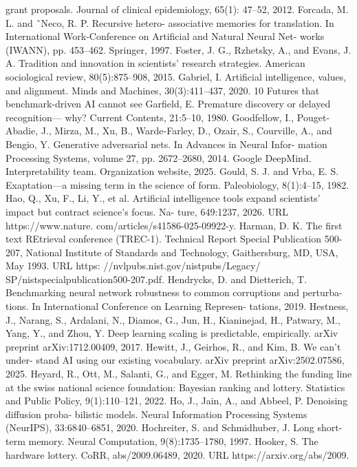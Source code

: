 grant proposals. Journal of clinical epidemiology, 65(1):
47–52, 2012.
Forcada, M. L. and ˜Neco, R. P.
Recursive hetero-
associative memories for translation. In International
Work-Conference on Artificial and Natural Neural Net-
works (IWANN), pp. 453–462. Springer, 1997.
Foster, J. G., Rzhetsky, A., and Evans, J. A. Tradition and
innovation in scientists’ research strategies. American
sociological review, 80(5):875–908, 2015.
Gabriel, I. Artificial intelligence, values, and alignment.
Minds and Machines, 30(3):411–437, 2020.
10
Futures that benchmark-driven AI cannot see
Garfield, E. Premature discovery or delayed recognition—
why? Current Contents, 21:5–10, 1980.
Goodfellow, I., Pouget-Abadie, J., Mirza, M., Xu, B.,
Warde-Farley, D., Ozair, S., Courville, A., and Bengio, Y.
Generative adversarial nets. In Advances in Neural Infor-
mation Processing Systems, volume 27, pp. 2672–2680,
2014.
Google DeepMind. Interpretability team. Organization
website, 2025.
Gould, S. J. and Vrba, E. S. Exaptation—a missing term in
the science of form. Paleobiology, 8(1):4–15, 1982.
Hao, Q., Xu, F., Li, Y., et al. Artificial intelligence tools
expand scientists’ impact but contract science’s focus. Na-
ture, 649:1237, 2026. URL https://www.nature.
com/articles/s41586-025-09922-y.
Harman, D. K.
The first text REtrieval conference
(TREC-1).
Technical Report Special Publication
500-207, National Institute of Standards and Technology,
Gaithersburg, MD, USA, May 1993.
URL https:
//nvlpubs.nist.gov/nistpubs/Legacy/
SP/nistspecialpublication500-207.pdf.
Hendrycks, D. and Dietterich, T. Benchmarking neural
network robustness to common corruptions and perturba-
tions. In International Conference on Learning Represen-
tations, 2019.
Hestness, J., Narang, S., Ardalani, N., Diamos, G., Jun,
H., Kianinejad, H., Patwary, M., Yang, Y., and Zhou, Y.
Deep learning scaling is predictable, empirically. arXiv
preprint arXiv:1712.00409, 2017.
Hewitt, J., Geirhos, R., and Kim, B.
We can’t under-
stand AI using our existing vocabulary. arXiv preprint
arXiv:2502.07586, 2025.
Heyard, R., Ott, M., Salanti, G., and Egger, M. Rethinking
the funding line at the swiss national science foundation:
Bayesian ranking and lottery. Statistics and Public Policy,
9(1):110–121, 2022.
Ho, J., Jain, A., and Abbeel, P. Denoising diffusion proba-
bilistic models. Neural Information Processing Systems
(NeurIPS), 33:6840–6851, 2020.
Hochreiter, S. and Schmidhuber, J. Long short-term memory.
Neural Computation, 9(8):1735–1780, 1997.
Hooker, S. The hardware lottery. CoRR, abs/2009.06489,
2020.
URL https://arxiv.org/abs/2009.

